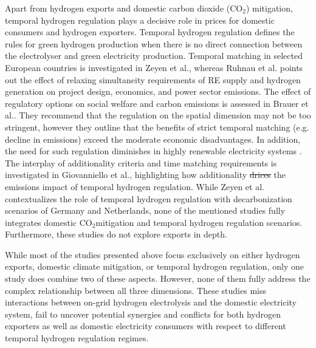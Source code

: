 \documentclass[5p,numafflabel]{elsarticle}
\newcommand{\co}{\ce{CO2}~}
\def\co{CO${}_2${\:}}
\providecommand{\DIFaddtex}[1]{{\protect\color{blue}\uwave{#1}}} %
\providecommand{\DIFdeltex}[1]{{\protect\color{red}\sout{#1}}}                      %
\providecommand{\DIFaddbegin}{} %
\providecommand{\DIFaddend}{} %
\providecommand{\DIFdelbegin}{} %
\providecommand{\DIFdelend}{} %
\providecommand{\DIFadd}[1]{\texorpdfstring{\DIFaddtex{#1}}{#1}} %
\providecommand{\DIFdel}[1]{\texorpdfstring{\DIFdeltex{#1}}{}} %
\newcommand{\DIFscaledelfig}{0.5}
\newlength{\DIFdelgraphicswidth} %
\newlength{\DIFdelgraphicsheight} %
\newcommand{\DIFaddincludegraphics}[2][]{{\color{blue}\fbox{\DIFOincludegraphics[#1]{#2}}}} %
\newcommand{\DIFdelincludegraphics}[2][]{%
\sbox{\DIFdelgraphicsbox}{\DIFOincludegraphics[#1]{#2}}%
\settoboxwidth{\DIFdelgraphicswidth}{\DIFdelgraphicsbox} %
\settoboxtotalheight{\DIFdelgraphicsheight}{\DIFdelgraphicsbox} %
\scalebox{\DIFscaledelfig}{%
\parbox[b]{\DIFdelgraphicswidth}{\usebox{\DIFdelgraphicsbox}\\[-\baselineskip] \rule{\DIFdelgraphicswidth}{0em}}\llap{\resizebox{\DIFdelgraphicswidth}{\DIFdelgraphicsheight}{%
\setlength{\unitlength}{\DIFdelgraphicswidth}%
\begin{picture}(1,1)%
\thicklines\linethickness{2pt} %
{\color[rgb]{1,0,0}\put(0,0){\framebox(1,1){}}}%
{\color[rgb]{1,0,0}\put(0,0){\line( 1,1){1}}}%
{\color[rgb]{1,0,0}\put(0,1){\line(1,-1){1}}}%
\end{picture}%
}\hspace*{3pt}}} %
} %
\DeclareRobustCommand{\DIFaddbegin}{\DIFOaddbegin \let\includegraphics\DIFaddincludegraphics} %
\DeclareRobustCommand{\DIFaddend}{\DIFOaddend \let\includegraphics\DIFOincludegraphics} %
\DeclareRobustCommand{\DIFdelbegin}{\DIFOdelbegin \let\includegraphics\DIFdelincludegraphics} %
\DeclareRobustCommand{\DIFdelend}{\DIFOaddend \let\includegraphics\DIFOincludegraphics} %
\begin{document}
Apart from hydrogen exports and domestic carbon dioxide (CO${}_2$) mitigation, temporal hydrogen regulation plays a decisive role in prices for domestic consumers and hydrogen exporters. 
Temporal hydrogen regulation defines the rules for green hydrogen production when there is no direct connection between the electrolyser and green electricity production.
Temporal matching in selected European countries is investigated in Zeyen et al.\cite{Zeyen2024}, whereas Ruhnau et al.\cite{Ruhnau2023a} points out the effect of relaxing simultaneity requirements of RE supply and hydrogen generation on project design, economics, and power sector emissions.
The effect of regulatory options on social welfare and carbon emissions is assessed in Brauer et al.\cite{Brauer2022}. They recommend that the regulation on the spatial dimension may not be too stringent, however they outline that the benefits of strict temporal matching (e.g. decline in emissions) exceed the moderate economic disadvantages. In addition, the need for such regulation diminishes in highly renewable electricity systems \cite{Brauer2022}.
The interplay of additionality criteria and time matching requirements is investigated in Giovanniello et al.\cite{Giovanniello2024}, highlighting how additionality \DIFdelbegin \DIFdel{drices }\DIFdelend \DIFaddbegin \DIFadd{drives }\DIFaddend the emissions impact of temporal hydrogen regulation.
While Zeyen et al.\cite{Zeyen2024} contextualizes the role of temporal hydrogen regulation with decarbonization scenarios of Germany and Netherlands, none of the mentioned studies fully integrates domestic \co mitigation and temporal hydrogen regulation scenarios. Furthermore, these studies do not explore exports in depth.

While most of the studies presented above focus exclusively on either hydrogen exports, domestic climate mitigation, or temporal hydrogen regulation, only one study\cite{Muller2024} does combine two of these aspects. However, none of them fully address the complex relationship between all three dimensions. 
These studies miss interactions between on-grid hydrogen electrolysis and the domestic electricity system, fail to uncover potential synergies and conflicts for both hydrogen exporters as well as domestic electricity consumers with respect to different temporal hydrogen regulation regimes.
\end{document}
